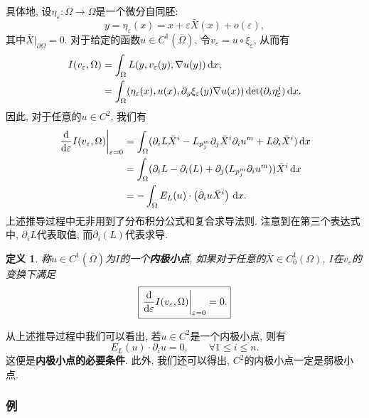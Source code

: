 \documentclass[12pt,a4paper]{article}
\newtheorem{definition}[theorem]{定义}
\begin{document}
具体地, 设$\eta_{\varepsilon}\colon \overline{\Omega} \rightarrow \overline{\Omega}$是一个微分自同胚:
\begin{equation*}
    y = \eta_{\varepsilon}(x) = x + \varepsilon\bar{X}(x) + o(\varepsilon),
\end{equation*}
其中$\bar{X}|_{\partial\Omega} = 0$. 对于给定的函数$u \in C^1(\overline{\Omega})$, 令$v_{\varepsilon} = u \circ \xi_{\varepsilon}$, 从而有 
\begin{align*}
    I(v_{\varepsilon}, \Omega) &= \int_{\Omega}L(y, v_{\varepsilon}(y), \nabla u(y)) \,{\rm d}x,\\  
    &= \int_{\Omega}(\eta_{\varepsilon}(x), u(x), \partial_y\xi_{\varepsilon}(y)\nabla u(x))\det(\partial_i\eta_{\varepsilon}^j) \,{\rm d}x. 
\end{align*}
因此, 对于任意的$u \in C^2$, 我们有
\begin{align*}
    \left.\frac{{\rm d}}{{\rm d}\varepsilon}I(v_{\varepsilon}, \Omega)\right|_{\varepsilon = 0} &= \int_{\Omega}(\partial_iL\bar{X}^i  -L_{p_j^m}\partial_j\bar{X}^i\partial_iu^m + L\partial_i\bar{X}^i) \,{\rm d}x \\
    &= \int_{\Omega}(\partial_iL -\partial_i(L) +\partial_j(L_{p_j^m}\partial_iu^m))\bar{X}^i \,{\rm d}x \\  
    &= -\int_{\Omega}E_L(u) \cdot \left(\partial_iu\bar{X}^i\right) \,{\rm d}x. 
\end{align*} 
上述推导过程中无非用到了分布积分公式和复合求导法则. 注意到在第三个表达式中, $\partial_iL$代表取值, 而$\partial_i(L)$代表求导.

\begin{definition}
    称$u \in C^1(\overline{\Omega})$为$I$的一个\textbf{内极小点}, 如果对于任意的$\bar{X} \in C_0^1(\Omega)$, $I$在$v_{\varepsilon}$的变换下满足
    \begin{equation*}
        \boxed{\left.\frac{{\rm d}}{{\rm d}\varepsilon}I(v_{\varepsilon}, \Omega)\right|_{\varepsilon = 0}  = 0.}
    \end{equation*} 
\end{definition}

从上述推导过程中我们可以看出, 若$u \in C^2$是一个内极小点, 则有 
\begin{equation*}
    \boxed{E_L(u) \cdot \partial_iu = 0, \qquad \forall 1 \leq i \leq n.}
\end{equation*}
这便是\textbf{内极小点的必要条件}. 此外, 我们还可以得出, $C^2$的内极小点一定是弱极小点.

\subsubsection{例}
\end{document}
